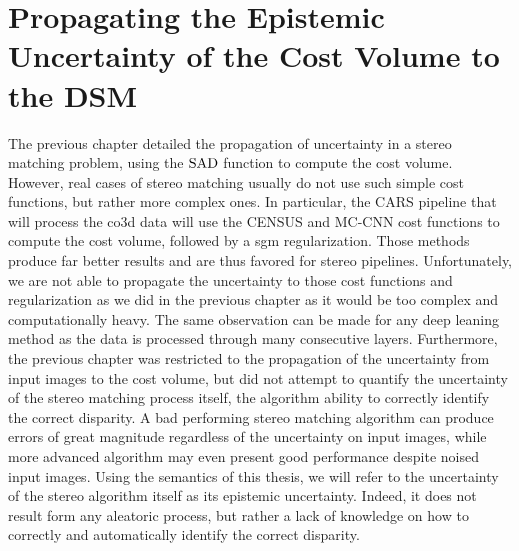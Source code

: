 \chapter{Propagating the Epistemic Uncertainty of the Cost Volume to the DSM}\label{chap:epistemic_uncertainty}

The previous chapter detailed the propagation of  uncertainty in a stereo matching problem, using the $\mathrm{SAD}$ function to compute the cost volume. However, real cases of stereo matching usually do not use such simple cost functions, but rather more complex ones. In particular, the CARS pipeline that will process the \acrshort{co3d} data will use the CENSUS and MC-CNN cost functions  \cite{zabih_non-parametric_1994,zbontar_stereo_2016} to compute the cost volume, followed by a \acrshort{sgm} regularization. Those methods produce far better results and are thus favored for stereo pipelines. Unfortunately, we are not able to propagate the uncertainty to those cost functions and regularization as we did in the previous chapter as it would be too complex and computationally heavy. The same observation can be made for any deep leaning method \cite{laga_survey_2022} as the data is processed through many consecutive layers. Furthermore, the previous chapter was restricted to the propagation of the uncertainty from input images to the cost volume, but did not attempt to quantify the uncertainty of the stereo matching process itself, \ie the algorithm ability to correctly identify the correct disparity. A bad performing stereo matching algorithm can produce errors of great magnitude regardless of the uncertainty on input images, while more advanced algorithm may even present good performance despite noised input images. Using the semantics of this thesis, we will refer to the uncertainty of the stereo algorithm itself as its epistemic uncertainty. Indeed, it does not result form any aleatoric process, but rather a lack of knowledge on how to correctly and automatically identify the correct disparity.

